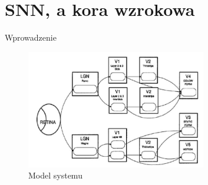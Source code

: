 \documentclass{beamer}
\begin{document}
\section{SNN, a kora wzrokowa}
\begin{frame}{Wprowadzenie}
\begin{figure}[ht]

		\centering
		\includegraphics[width=0.7\textwidth]{visualSystemModel.png}
		\caption{Model systemu}

	\end{figure}
\end{frame}
\end{document}
